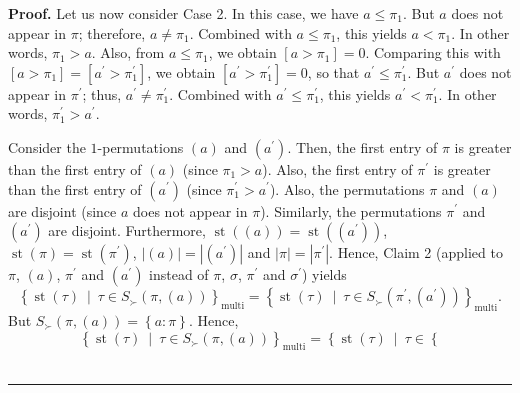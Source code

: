 \documentclass[numbers=enddot,12pt,final,onecolumn,notitlepage]{scrartcl}%
\theoremstyle{definition}
\newenvironment{proof}[1][Proof]{\noindent\textbf{#1.} }{\ \rule{0.5em}{0.5em}}
\begin{document}
\begin{proof}
Let us now consider Case 2. In this case, we have $a\leq\pi_{1}$. But $a$ does
not appear in $\pi$; therefore, $a\neq\pi_{1}$. Combined with $a\leq\pi_{1}$,
this yields $a<\pi_{1}$. In other words, $\pi_{1}>a$. Also, from $a\leq\pi
_{1}$, we obtain $\left[  a>\pi_{1}\right]  =0$. Comparing this with $\left[
a>\pi_{1}\right]  =\left[  a^{\prime}>\pi_{1}^{\prime}\right]  $, we obtain
$\left[  a^{\prime}>\pi_{1}^{\prime}\right]  =0$, so that $a^{\prime}\leq
\pi_{1}^{\prime}$. But $a^{\prime}$ does not appear in $\pi^{\prime}$; thus,
$a^{\prime}\neq\pi_{1}^{\prime}$. Combined with $a^{\prime}\leq\pi_{1}%
^{\prime}$, this yields $a^{\prime}<\pi_{1}^{\prime}$. In other words,
$\pi_{1}^{\prime}>a^{\prime}$.

Consider the $1$-permutations $\left(  a\right)  $ and $\left(  a^{\prime
}\right)  $. Then, the first entry of $\pi$ is greater than the first entry of
$\left(  a\right)  $ (since $\pi_{1}>a$). Also, the first entry of
$\pi^{\prime}$ is greater than the first entry of $\left(  a^{\prime}\right)
$ (since $\pi_{1}^{\prime}>a^{\prime}$). Also, the permutations $\pi$ and
$\left(  a\right)  $ are disjoint (since $a$ does not appear in $\pi$).
Similarly, the permutations $\pi^{\prime}$ and $\left(  a^{\prime}\right)  $
are disjoint. Furthermore, $\operatorname*{st}\left(  \left(  a\right)
\right)  =\operatorname*{st}\left(  \left(  a^{\prime}\right)  \right)  $,
$\operatorname*{st}\left(  \pi\right)  =\operatorname*{st}\left(  \pi^{\prime
}\right)  $, $\left\vert \left(  a\right)  \right\vert =\left\vert \left(
a^{\prime}\right)  \right\vert $ and $\left\vert \pi\right\vert =\left\vert
\pi^{\prime}\right\vert $. Hence, Claim 2 (applied to $\pi$, $\left(
a\right)  $, $\pi^{\prime}$ and $\left(  a^{\prime}\right)  $ instead of $\pi
$, $\sigma$, $\pi^{\prime}$ and $\sigma^{\prime}$) yields%
\begin{equation}
\left\{  \operatorname*{st}\left(  \tau\right)  \ \mid\ \tau\in S_{\succ
}\left(  \pi,\left(  a\right)  \right)  \right\}  _{\operatorname*{multi}%
}=\left\{  \operatorname*{st}\left(  \tau\right)  \ \mid\ \tau\in S_{\succ
}\left(  \pi^{\prime},\left(  a^{\prime}\right)  \right)  \right\}
_{\operatorname*{multi}}. \label{pf.prop.LRcomp.equivs.3to4.5}%
\end{equation}
But $S_{\succ}\left(  \pi,\left(  a\right)  \right)  =\left\{  a:\pi\right\}
$. Hence,%
\[
\left\{  \operatorname*{st}\left(  \tau\right)  \ \mid\ \tau\in S_{\succ
}\left(  \pi,\left(  a\right)  \right)  \right\}  _{\operatorname*{multi}%
}=\left\{  \operatorname*{st}\left(  \tau\right)  \ \mid\ \tau\in\left\{
\]
\end{proof}
\end{document}
